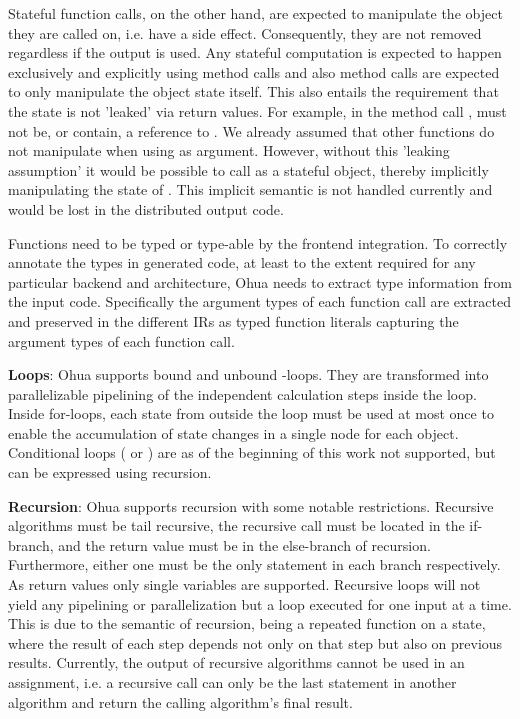 Stateful function calls, on the other hand, are expected to manipulate the object they are called on, i.e. have a side effect. Consequently, they are not removed regardless if the output is used. 
Any stateful computation is expected to happen exclusively and explicitly using method calls and also method calls are expected to only manipulate the object state itself. This also entails the requirement that the state is not 'leaked' via return values. For example, in the method call ,  must not be, or contain, a reference to . We already assumed that other functions do not manipulate  when using  as argument. However, without this 'leaking assumption' it would be possible to call  as a stateful object, thereby implicitly manipulating the state of . This implicit semantic is not handled currently and would be lost in the distributed output code. 

Functions need to be typed or type-able by the frontend integration. To correctly annotate the types in generated code, at least to the extent required for any particular backend and architecture, Ohua needs to extract type information from the input code. Specifically the argument types of each function call are extracted and preserved in the different IRs as typed function literals capturing the argument types of each function call. 

\textbf{Loops}: Ohua supports bound and unbound -loops. They are transformed into parallelizable pipelining of the independent calculation steps inside the loop. Inside for-loops, each state from outside the loop must be used at most once to enable the accumulation of state changes in a single node for each object. Conditional loops ( or ) are as of the beginning of this work not supported, but can be expressed using recursion.

\textbf{Recursion}: Ohua supports recursion with some notable restrictions. Recursive algorithms must be tail recursive, the recursive call must be located in the if-branch, and the return value must be in the else-branch of recursion. Furthermore, either one must be the only statement in each branch respectively. As return values only single variables are supported. Recursive loops will not yield any pipelining or parallelization but a loop executed for one input at a time. This is due to the semantic of recursion, being a repeated function on a state, where the result of each step depends not only on that step but also on previous results.
Currently, the output of recursive algorithms cannot be used in an assignment, i.e. a recursive call can only be the last statement in another algorithm and return the calling algorithm's final result. 


